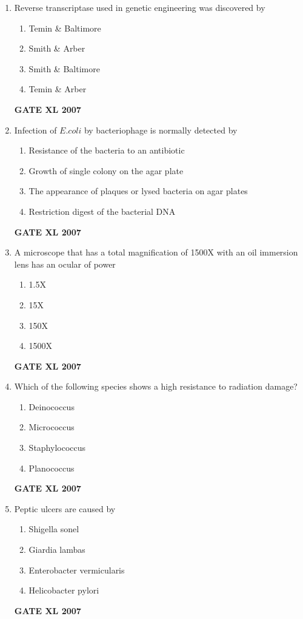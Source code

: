 \documentclass[journal,12pt,onecolumn]{IEEEtran}
\begin{document}
\begin{enumerate}
\item Reverse transcriptase used in genetic engineering was discovered by
\begin{enumerate}
    \item Temin \& Baltimore
    \item Smith \& Arber
    \item Smith \& Baltimore
    \item Temin \& Arber
\end{enumerate}\hfill{\textbf{GATE XL 2007}}

\item Infection of $E.coli$ by bacteriophage is normally detected by
\begin{enumerate}
    \item Resistance of the bacteria to an antibiotic
    \item Growth of single colony on the agar plate
    \item The appearance of plaques or lysed bacteria on agar plates
    \item Restriction digest of the bacterial DNA
\end{enumerate}\hfill{\textbf{GATE XL 2007}}

\item A microscope that has a total magnification of 1500X with an oil immersion lens has an ocular of power
\begin{enumerate}
    \item 1.5X
    \item 15X
    \item 150X
    \item 1500X
\end{enumerate}\hfill{\textbf{GATE XL 2007}}

\item Which of the following species shows a high resistance to radiation damage?
\begin{enumerate}
    \item Deinococcus
    \item Micrococcus
    \item Staphylococcus
    \item Planococcus
\end{enumerate}\hfill{\textbf{GATE XL 2007}}

\item Peptic ulcers are caused by
\begin{enumerate}
    \item Shigella sonel
    \item Giardia lambas
    \item Enterobacter vermicularis
    \item Helicobacter pylori
\end{enumerate}\hfill{\textbf{GATE XL 2007}}


\end{enumerate}
\end{document}
